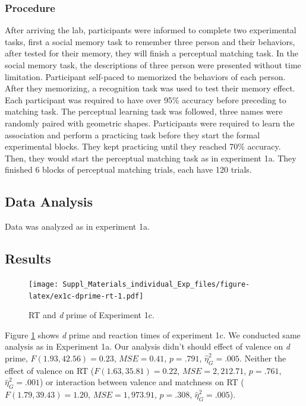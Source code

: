 \documentclass[
  english,
  man]{apa6}
\begin{document}
\hypertarget{procedure-2}{%
\subsubsection{Procedure}\label{procedure-2}}

After arriving the lab, participants were informed to complete two experimental tasks, first a social memory task to remember three person and their behaviors, after tested for their memory, they will finish a perceptual matching task.
In the social memory task, the descriptions of three person were presented without time limitation. Participant self-paced to memorized the behaviors of each person. After they memorizing, a recognition task was used to test their memory effect. Each participant was required to have over 95\% accuracy before preceding to matching task.
The perceptual learning task was followed, three names were randomly paired with geometric shapes. Participants were required to learn the association and perform a practicing task before they start the formal experimental blocks. They kept practicing until they reached 70\% accuracy. Then, they would start the perceptual matching task as in experiment 1a. They finished 6 blocks of perceptual matching trials, each have 120 trials.

\hypertarget{data-analysis-2}{%
\subsection{Data Analysis}\label{data-analysis-2}}

Data was analyzed as in experiment 1a.

\hypertarget{results-2}{%
\subsection{Results}\label{results-2}}

\begin{figure}
\centering
\texttt{[image: Suppl\_Materials\_individual\_Exp\_files/figure-latex/ex1c-dprime-rt-1.pdf]}
\caption{\label{fig:ex1c-dprime-rt}RT and \emph{d} prime of Experiment 1c.}
\end{figure}

Figure \ref{fig:ex1c-dprime-rt} shows \emph{d} prime and reaction times of experiment 1c. We conducted same analysis as in Experiment 1a. Our analysis didn't should effect of valence on \emph{d} prime, \(F(1.93, 42.56) = 0.23\), \(\mathit{MSE} = 0.41\), \(p = .791\), \(\hat{\eta}^2_G = .005\). Neither the effect of valence on RT (\(F(1.63, 35.81) = 0.22\), \(\mathit{MSE} = 2,212.71\), \(p = .761\), \(\hat{\eta}^2_G = .001\)) or interaction between valence and matchness on RT (\(F(1.79, 39.43) = 1.20\), \(\mathit{MSE} = 1,973.91\), \(p = .308\), \(\hat{\eta}^2_G = .005\)).
\end{document}
